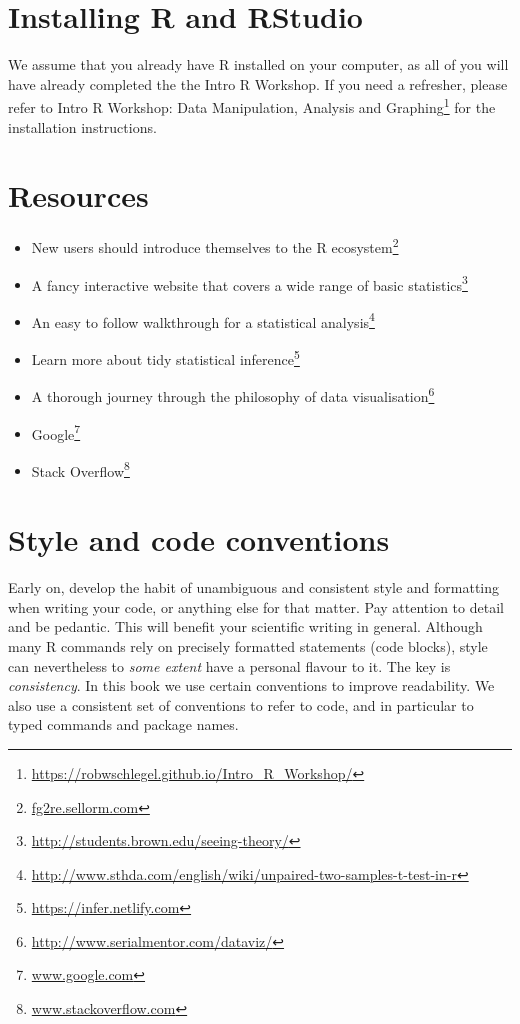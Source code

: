 \documentclass[english,10pt,a4paper,oneside]{book}
\renewcommand{\href}[2]{#2\footnote{\url{#1}}}
\let\rmarkdownfootnote\footnote%
\def\footnote{\protect\rmarkdownfootnote}
\providecommand{\tightlist}{%
  \setlength{\itemsep}{0pt}\setlength{\parskip}{0pt}}
\theoremstyle{definition}
\theoremstyle{definition}
\theoremstyle{definition}
\theoremstyle{remark}
\begin{document}
\hypertarget{installing-r-and-rstudio}{%
\section{Installing R and RStudio}\label{installing-r-and-rstudio}}

We assume that you already have R installed on your computer, as all of
you will have already completed the the Intro R Workshop. If you need a
refresher, please refer to
\href{https://robwschlegel.github.io/Intro_R_Workshop/}{Intro R
Workshop: Data Manipulation, Analysis and Graphing} for the installation
instructions.

\hypertarget{resources}{%
\section{Resources}\label{resources}}

\begin{itemize}
\tightlist
\item
  New users should introduce themselves to the
  \href{fg2re.sellorm.com}{R ecosystem}
\item
  A fancy interactive website that covers a wide range of
  \href{http://students.brown.edu/seeing-theory/}{basic statistics}
\item
  An easy to follow walkthrough for a
  \href{http://www.sthda.com/english/wiki/unpaired-two-samples-t-test-in-r}{statistical
  analysis}
\item
  Learn more about \href{https://infer.netlify.com}{tidy statistical
  inference}
\item
  A thorough journey through the philosophy of
  \href{http://www.serialmentor.com/dataviz/}{data visualisation}
\item
  \href{www.google.com}{Google}
\item
  \href{www.stackoverflow.com}{Stack Overflow}
\end{itemize}

\hypertarget{style-and-code-conventions}{%
\section{Style and code conventions}\label{style-and-code-conventions}}

Early on, develop the habit of unambiguous and consistent style and
formatting when writing your code, or anything else for that matter. Pay
attention to detail and be pedantic. This will benefit your scientific
writing in general. Although many R commands rely on precisely formatted
statements (code blocks), style can nevertheless to \emph{some extent}
have a personal flavour to it. The key is \emph{consistency}. In this
book we use certain conventions to improve readability. We also use a
consistent set of conventions to refer to code, and in particular to
typed commands and package names.
\end{document}
